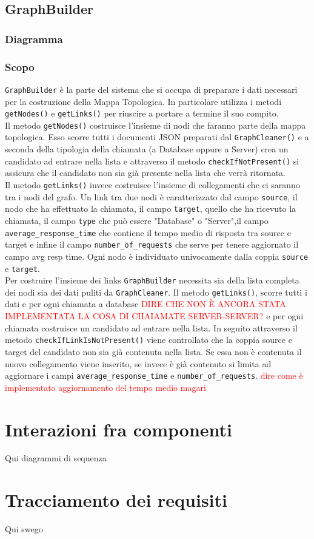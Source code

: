 \subsection{GraphBuilder}
\label{sec:GraphBuilder}
	\subsubsection{Diagramma}

	\subsubsection{Scopo}
	\texttt{GraphBuilder} è la parte del sistema che si occupa di preparare i dati necessari per la costruzione della Mappa Topologica. In particolare utilizza i metodi \texttt{getNodes()} e \texttt{getLinks()} per riuscire a portare a termine il suo compito.\\
	Il metodo \texttt{getNodes()} costruisce l'insieme di nodi che faranno parte della mappa topologica. Esso scorre tutti i documenti JSON preparati dal \texttt{GraphCleaner()} e a seconda della tipologia della chiamata (a Database oppure a Server) crea un candidato ad entrare nella lista e attraverso il metodo \texttt{checkIfNotPresent()} si assicura che il candidato non sia già presente nella lista che verrà ritornata.\\
	Il metodo \texttt{getLinks()} invece costruisce l'insieme di collegamenti che ci saranno tra i nodi del grafo. Un link tra due nodi è caratterizzato dal campo \texttt{source}, il nodo che ha effettuato la chiamata, il campo \texttt{target}, quello che ha ricevuto la chiamata, il campo \texttt{type} che può essere "Database" o "Server",il campo \texttt{average\_response\_time} che contiene il tempo medio di risposta tra source e target e infine il campo \texttt{number\_of\_requests} che serve per tenere aggiornato il campo avg resp time. Ogni nodo è individuato univocamente dalla coppia \texttt{source} e \texttt{target}.\\
	Per costruire l'insieme dei links \texttt{GraphBuilder} necessita sia della lista completa dei nodi sia dei dati puliti da \texttt{GraphCleaner}. Il metodo \texttt{getLinks()}, scorre tutti i dati e per ogni chiamata a database \textcolor{red}{DIRE CHE NON È ANCORA STATA IMPLEMENTATA LA COSA DI CHAIAMATE SERVER-SERVER?} e per ogni chiamata costruisce un candidato ad entrare nella lista. In seguito attraverso il metodo \texttt{checkIfLinkIsNotPresent()} viene controllato che la coppia source e target del candidato non sia già contenuta nella lista. Se essa non è contenuta il nuovo collegamento viene inserito, se invece è già contenuto si limita ad aggiornare i campi \texttt{average\_response\_time} e \texttt{number\_of\_requests}. \textcolor{red}{dire come è implementato aggiornamento del tempo medio magari}


\section{Interazioni fra componenti}
\label{sec:Interazioni}
Qui diagrammi di sequenza

\section{Tracciamento dei requisiti}
\label{sec:Tracciamento}
Qui swego 
